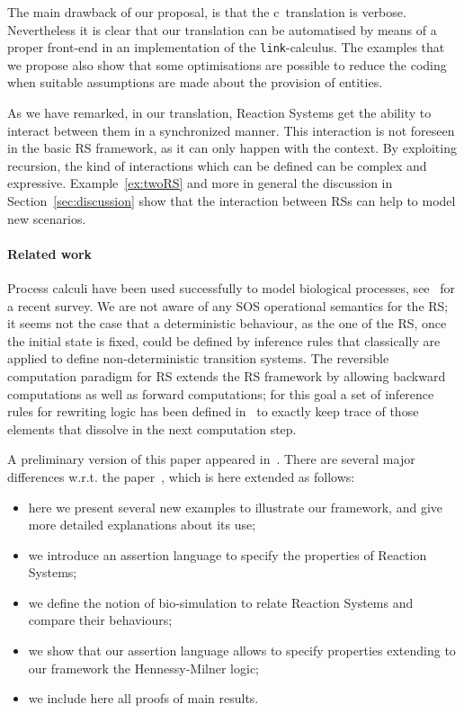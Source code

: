 The main drawback of our proposal, is that the c\CNA \ translation is
verbose. Nevertheless it is clear that our
translation can be automatised by means of a proper front-end in
an implementation of the {\tt link}-calculus. 
The examples that we propose also show that some optimisations are possible
to reduce the coding when suitable assumptions are made about the provision of entities.

As we have remarked, in our translation, Reaction Systems 
get the ability to interact between them in a synchronized manner. 
This interaction is not foreseen in
the basic RS framework, as it can only happen with the context.
By exploiting recursion, the kind of interactions which can be 
defined can be complex and expressive.
Example~\ref{ex:twoRS} and more in general the discussion in 
Section~\ref{sec:discussion} show that 
the interaction between RSs can help to model new scenarios.

\paragraph{Related work}

Process calculi have been used successfully to model
biological processes, see~\cite{BBDFH18} for a recent survey.
We are not aware of any SOS operational semantics for the RS; it seems not the case
that a deterministic behaviour, as the one of the RS, once the initial state is 
fixed, could be defined by inference rules that classically are applied 
to define non-deterministic transition systems.
The reversible computation paradigm for RS extends the RS framework  by
allowing  backward computations as well as forward computations; for this 
goal a set of inference rules for rewriting logic has been 
defined in~\cite{10.1007/978-3-319-73359-3_3}
to exactly keep trace of those elements that  dissolve in the next 
computation step.


A preliminary version of this paper appeared in~\cite{BBF19}.
There are several major differences w.r.t. the paper~\cite{BBF19}, which is here extended as follows:
\begin{itemize}
\item here we present several new examples to illustrate our framework,
and give more detailed explanations about its use;
\item we introduce an assertion language to specify the properties of Reaction Systems;
\item we define the notion of bio-simulation to relate Reaction Systems and compare their behaviours;
\item we show that our assertion language allows to specify properties extending to our
framework the Hennessy-Milner logic;
\item we include here all proofs of main results.
\end{itemize}
 
